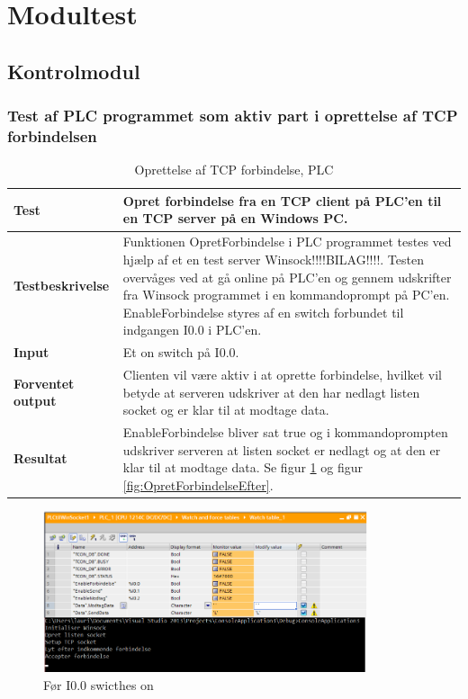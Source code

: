 
\section{Modultest}

\subsection{Kontrolmodul}

\subsubsection{Test af PLC programmet som aktiv part i oprettelse af TCP forbindelsen}
\begin{table}[H]
	\centering
	\begin{tabular}{ | m{} | m{}|} 
		\hline
		\textbf{Test}					&Opret forbindelse fra en TCP client på PLC'en til en TCP server på en Windows PC. \\ \hline
		\textbf{Testbeskrivelse}		&Funktionen OpretForbindelse i PLC programmet testes ved hjælp af et en test server Winsock!!!!BILAG!!!!. Testen overvåges ved at gå online på PLC'en og gennem udskrifter fra Winsock programmet i en kommandoprompt på PC'en. EnableForbindelse styres af en switch forbundet til indgangen I0.0 i PLC'en.\\ \hline
		\textbf{Input}					& Et on switch på I0.0.\\ \hline
		\textbf{Forventet output}		&Clienten vil være aktiv i at oprette forbindelse, hvilket vil betyde at serveren udskriver at den har nedlagt listen socket og er klar til at modtage data.\\ \hline
		\textbf{Resultat}				&EnableForbindelse bliver sat true og i kommandoprompten udskriver serveren at listen socket er nedlagt og at den er klar til at modtage data. Se figur \ref{fig:OpretForbindelseFoer} og figur \ref{fig:OpretForbindelseEfter}.   \\ \hline
	\end{tabular}
	\caption{Oprettelse af TCP forbindelse, PLC} 
	\label{tab:PLCopretForbindelse}
\end{table}

\begin{figure}[H] %
	\centering
	\includegraphics[width=0.85\textwidth]{Test/ModultestStyringsenhed/OpretForbindelseFoer}
	\caption{Før I0.0 swicthes on}
	\label{fig:OpretForbindelseFoer}
\end{figure}

